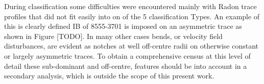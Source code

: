 During classification some difficulties were encountered mainly with Radon trace profiles that did not fit easily into on of the 5 classification Types. An example of this is clearly defined IB of 8555-3701 is imposed on an asymmetric trace as shown in Figure [TODO]. In many other cases bends, or velocity field disturbances, are evident as notches at well off-centre radii on otherwise constant or largely asymmetric traces. To obtain a comprehensive census at this level of detail these sub-dominant and off-centre, features should be into account in a secondary analysis, which is outside the scope of this present work.


